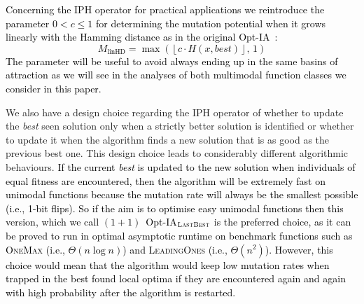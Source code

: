 \documentclass[lettersize,journal]{IEEEtran}
\newcommand{\rerev}[1]{\textcolor{black}{#1}}
\begin{document}
\textcolor{black}{Concerning the IPH operator for practical applications we  reintroduce the parameter \rerev{$0 < c \leq 1$} for determining the mutation potential when it grows linearly with the Hamming distance as in the original Opt-IA~\cite{JansenZarges2011}:}  
 \textcolor{black}{
 $$M_{\text{linHD}} = \max\!\left(\left\lfloor c \cdot H(x,\mathit{best}) \right\rfloor,\, 1 \right)$$
 }
\textcolor{black}{The parameter will be useful to avoid always ending up in the same basins of attraction as we will see in the analyses of both multimodal function classes we consider in this paper.} 
 
{\color{black} We also have  a design choice regarding the IPH operator  of whether to update the {\it best} seen solution only when a strictly better solution is identified or whether to update it when the algorithm finds a new solution that is as good as the previous best one. 
This design choice leads to considerably different algorithmic behaviours.}
\textcolor{black}{If the current {\it best} is updated to the new solution when individuals of equal fitness are encountered,  then the algorithm will be extremely fast on unimodal functions because the mutation rate will always be the smallest possible (i.e., 1-bit flips). So if the aim is to optimise easy unimodal functions then this version, which we call $(1+1)$~Opt-IA$_{\textsc{LastBest}}$ is the preferred choice, as it can be proved to run in optimal asymptotic runtime on benchmark functions such as \textsc{OneMax} (i.e., $\Theta(n \log n)$) and \textsc{LeadingOnes} (i.e., $\Theta(n^2)$). However, this choice would mean that the algorithm would keep low mutation rates when trapped in the best found local optima if they are encountered again and again with high probability after the algorithm is restarted.}
\end{document}
